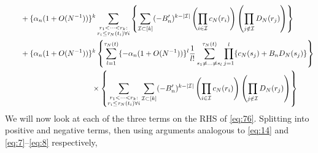 \documentclass{article}
\newcommand{\1}[1]{\mathbbm{1}_{#1}}
\begin{document}
\begin{align}
&\qquad+ \{ \alpha_n (1 + O(N^{-1}) ) \}^k \sum_{\substack{r_1 <\dots< r_k :\\ r_i \leq \tau_N(t_i) \forall i}}
\left\{ \sum_{\mathcal{I} \subset [k]} (-B_n^\prime)^{k-|\mathcal{I}|}
\left( \prod_{i\in\mathcal{I}} c_N(r_i) \right)
\left( \prod_{j\notin\mathcal{I}} D_N(r_j) \right)
\right\} \notag\\
&\qquad+ \{ \alpha_n (1 + O(N^{-1}) ) \}^k
\left\{ \sum_{l=1}^{\tau_N(t)} \{ - \alpha_n (1 + O(N^{-1}) ) \}^l \frac{1}{l!}
\sum_{s_1 \neq \dots \neq s_l}^{\tau_N(t)} \prod_{j=1}^l
\{ c_N(s_j) + B_n D_N(s_j) \} \right\} \notag\\
&\hspace{4cm}\times
\left\{ \sum_{\substack{r_1 <\dots< r_k :\\ r_i \leq \tau_N(t_i) \forall i}}
\sum_{\mathcal{I} \subset [k]} (-B_n^\prime)^{k-|\mathcal{I}|}
\left( \prod_{i\in\mathcal{I}} c_N(r_i) \right)
\left( \prod_{j\notin\mathcal{I}} D_N(r_j) \right)
\right\} \label{eq:76}
\end{align}
We will now look at each of the three terms on the RHS of \eqref{eq:76}.
Splitting into positive and negative terms, then using arguments analogous to \eqref{eq:14} and \eqref{eq:7}--\eqref{eq:8} respectively,
\end{document}
